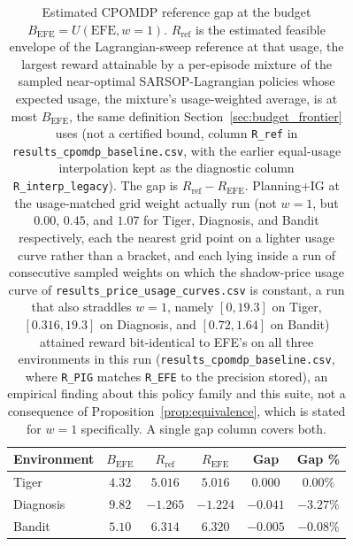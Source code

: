 \begin{table}[h]
\centering
\caption{Estimated CPOMDP reference gap at the budget $B_{\mathrm{EFE}} = U(\text{EFE}, w{=}1)$. $R_{\mathrm{ref}}$ is the estimated feasible envelope of the Lagrangian-sweep reference at that usage, the largest reward attainable by a per-episode mixture of the sampled near-optimal SARSOP-Lagrangian policies whose expected usage, the mixture's usage-weighted average, is at most $B_{\mathrm{EFE}}$, the same definition Section~\ref{sec:budget_frontier} uses (not a certified bound, column \texttt{R\_\allowbreak ref} in \texttt{results\_\allowbreak cpomdp\_\allowbreak baseline.csv}, with the earlier equal-usage interpolation kept as the diagnostic column \texttt{R\_\allowbreak interp\_\allowbreak legacy}). The gap is $R_{\mathrm{ref}} - R_{\mathrm{EFE}}$. Planning+IG at the usage-matched grid weight actually run (not $w{=}1$, but $0.00$, $0.45$, and $1.07$ for Tiger, Diagnosis, and Bandit respectively, each the nearest grid point on a lighter usage curve rather than a bracket, and each lying inside a run of consecutive sampled weights on which the shadow-price usage curve of \texttt{results\_\allowbreak price\_\allowbreak usage\_\allowbreak curves.csv} is constant, a run that also straddles $w{=}1$, namely $[0, 19.3]$ on Tiger, $[0.316, 19.3]$ on Diagnosis, and $[0.72, 1.64]$ on Bandit) attained reward bit-identical to EFE's on all three environments in this run (\texttt{results\_\allowbreak cpomdp\_\allowbreak baseline.csv}, where \texttt{R\_\allowbreak PIG} matches \texttt{R\_\allowbreak EFE} to the precision stored), an empirical finding about this policy family and this suite, not a consequence of Proposition~\ref{prop:equivalence}, which is stated for $w{=}1$ specifically. A single gap column covers both.}
\label{tab:cpomdp}
\tablefontsize
\begin{tabular}{lccccc}
\toprule
Environment & $B_{\mathrm{EFE}}$ & $R_{\mathrm{ref}}$ & $R_{\mathrm{EFE}}$ & Gap & Gap \% \\
\midrule
Tiger & $4.32$ & $5.016$ & $5.016$ & $0.000$ & $0.00\%$ \\
Diagnosis & $9.82$ & $-1.265$ & $-1.224$ & $-0.041$ & $-3.27\%$ \\
Bandit & $5.10$ & $6.314$ & $6.320$ & $-0.005$ & $-0.08\%$ \\
\bottomrule
\end{tabular}
\end{table}

